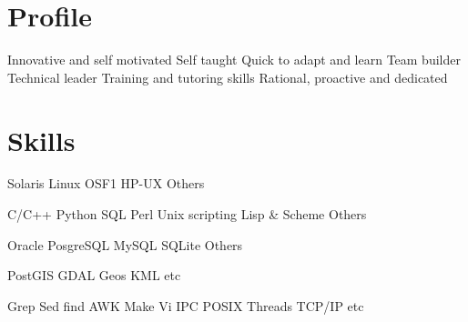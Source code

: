 \documentclass[letterpaper]{cvitae}
\begin{document}

\begin{minipage}[t]{0.33\textwidth}

\section{Profile}


\textbullet{} Innovative and self motivated
\textbullet{} Self taught
\textbullet{} Quick to adapt and learn
\textbullet{} Team builder
\textbullet{} Technical leader
\textbullet{} Training and tutoring skills
\textbullet{} Rational, proactive and dedicated
\sectionspace
\section {Skills}

\textbullet{} Solaris \textbullet{} Linux \textbullet{} OSF1 \textbullet{} HP-UX \textbullet{} Others

\textbullet{} C/C++ \textbullet{} Python \textbullet{} SQL \textbullet{} Perl \textbullet{} Unix scripting
\textbullet{} {Lisp \& Scheme} \textbullet{} Others

\textbullet{} Oracle \textbullet{} PosgreSQL \textbullet{} MySQL \textbullet{} SQLite \textbullet{} Others

\textbullet{} PostGIS \textbullet{} GDAL \textbullet{} Geos \textbullet{} KML \textbullet{} etc

\textbullet{} Grep \textbullet{} Sed \textbullet{} find \textbullet{} AWK \textbullet{} Make
\textbullet{} Vi \textbullet{} IPC \textbullet{} POSIX Threads \textbullet{} TCP/IP \textbullet{} etc


\end{minipage}
\end{document}
